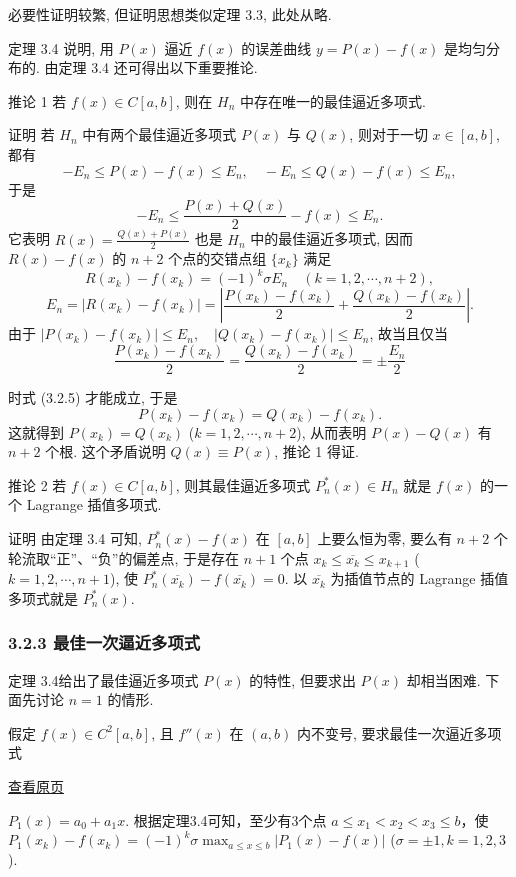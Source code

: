 \documentclass[
  10pt,
  fontset=fandol]{ctexart}
\begin{document}
必要性证明较繁, 但证明思想类似定理 3.3, 此处从略.

定理 3.4 说明, 用 \(P(x)\) 逼近 \(f(x)\) 的误差曲线 \(y=P(x)-f(x)\) 是均匀分布的. 由定理 3.4 还可得出以下重要推论.

推论 1 若 \(f(x) \in C[a,b]\), 则在 \(H_n\) 中存在唯一的最佳逼近多项式.

证明 若 \(H_n\) 中有两个最佳逼近多项式 \(P(x)\) 与 \(Q(x)\), 则对于一切 \(x \in [a,b]\), 都有 \[
-E_n \leqslant P(x)-f(x) \leqslant E_n, \quad -E_n \leqslant Q(x)-f(x) \leqslant E_n,
\] 于是 \[
-E_n \leqslant \frac{P(x)+Q(x)}{2}-f(x) \leqslant E_n.
\] 它表明 \(R(x)=\frac{Q(x)+P(x)}{2}\) 也是 \(H_n\) 中的最佳逼近多项式, 因而 \(R(x)-f(x)\) 的 \(n+2\) 个点的交错点组 \(\{x_k\}\) 满足 \[
R(x_k)-f(x_k)=(-1)^k \sigma E_n \quad (k=1,2,\cdots,n+2),
\] \[
E_n=\left|R(x_k)-f(x_k)\right|=\left|\frac{P(x_k)-f(x_k)}{2}+\frac{Q(x_k)-f(x_k)}{2}\right|. \tag{3.2.5}
\] 由于 \(\left|P(x_k)-f(x_k)\right| \leqslant E_n, \quad \left|Q(x_k)-f(x_k)\right| \leqslant E_n\), 故当且仅当 \[
\frac{P(x_k)-f(x_k)}{2}=\frac{Q(x_k)-f(x_k)}{2}=\pm \frac{E_n}{2}
\]

时式 (3.2.5) 才能成立, 于是 \[
P(x_k)-f(x_k)=Q(x_k)-f(x_k).
\] 这就得到 \(P(x_k)=Q(x_k)\) (\(k=1,2,\cdots,n+2\)), 从而表明 \(P(x)-Q(x)\) 有 \(n+2\) 个根. 这个矛盾说明 \(Q(x) \equiv P(x)\), 推论 1 得证.

推论 2 若 \(f(x) \in C[a,b]\), 则其最佳逼近多项式 \(P_n^*(x) \in H_n\) 就是 \(f(x)\) 的一个 Lagrange 插值多项式.

证明 由定理 3.4 可知, \(P_n^*(x)-f(x)\) 在 \([a,b]\) 上要么恒为零, 要么有 \(n+2\) 个轮流取``正''、``负''的偏差点, 于是存在 \(n+1\) 个点 \(x_k \leqslant \overline{x_k} \leqslant x_{k+1}\) (\(k=1,2,\cdots,n+1\)), 使 \(P_n^*(\overline{x_k})-f(\overline{x_k})=0\). 以 \(\overline{x_k}\) 为插值节点的 Lagrange 插值多项式就是 \(P_n^*(x)\).

\subsubsection{3.2.3 最佳一次逼近多项式}\label{ux6700ux4f73ux4e00ux6b21ux903cux8fd1ux591aux9879ux5f0f}

定理 3.4给出了最佳逼近多项式 \(P(x)\) 的特性, 但要求出 \(P(x)\) 却相当困难. 下面先讨论 \(n=1\) 的情形.

假定 \(f(x) \in C^2[a,b]\), 且 \(f''(x)\) 在 \((a,b)\) 内不变号, 要求最佳一次逼近多项式

\href{../../source-images/pdf-064.jpeg}{查看原页}

\(P_1(x) = a_0 + a_1x\). 根据定理3.4可知，至少有3个点 \(a \leqslant x_1 < x_2 < x_3 \leqslant b\)，使 \(P_1(x_k) - f(x_k) = (-1)^k \sigma \max_{a \leqslant x \leqslant b} |P_1(x) - f(x)|\) (\(\sigma = \pm 1, k = 1, 2, 3\)).
\end{document}
